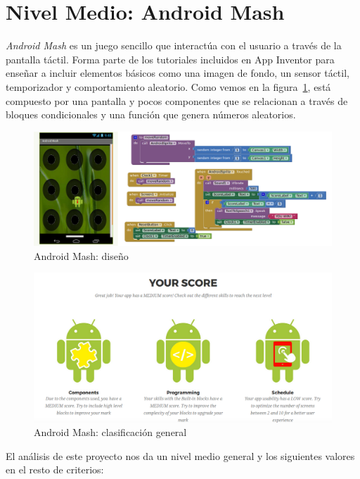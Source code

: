 \documentclass[a4paper, 12pt]{book}
\begin{document}
\section{Nivel Medio: Android Mash} 
\textit{Android Mash} es un juego sencillo que interactúa con el usuario a través de la pantalla táctil. Forma parte de los tutoriales incluidos en App Inventor para enseñar a incluir elementos básicos como una imagen de fondo, un sensor táctil, temporizador y comportamiento aleatorio. 
Como vemos en la figura~\ref{fig:AndroidMash}, está compuesto por una pantalla y pocos componentes que se relacionan a través de bloques condicionales y una función que genera números aleatorios. 
\begin{figure}[H]
  \centering
  \includegraphics[width=\linewidth, keepaspectratio]{img/AndroidMash}
  \caption{Android Mash: diseño}
  \label{fig:AndroidMash}
\end{figure}
\begin{figure}[H]
  \centering
  \includegraphics[width=\linewidth, keepaspectratio]{img/AndroidMashGlobal}
  \caption{Android Mash: clasificación general}
  \label{fig:AndroidMashGlobal}
\end{figure}
El análisis de este proyecto nos da un nivel medio general y los siguientes valores en el resto de criterios:
\end{document}
